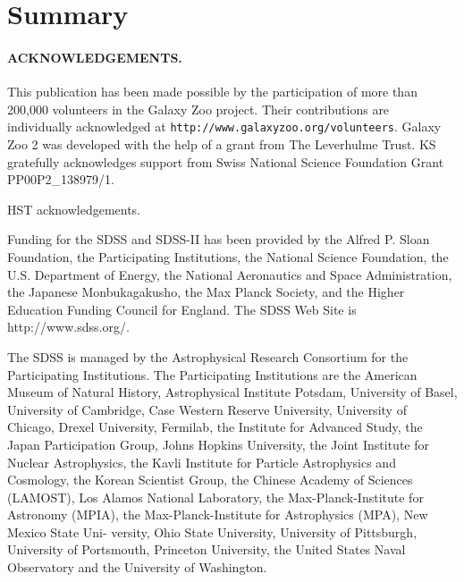 \documentclass[usenatbib]{mn2e}
\begin{document}
\section{Summary}

 
\paragraph*{ACKNOWLEDGEMENTS.} 

This publication has been made possible by the participation of more than 200,000 volunteers in the Galaxy Zoo project. Their contributions are individually acknowledged at \texttt{http://www.galaxyzoo.org/volunteers}. Galaxy Zoo 2 was developed with the help of a grant from The Leverhulme Trust. KS gratefully acknowledges support from Swiss National Science Foundation Grant PP00P2\_138979/1.

HST acknowledgements.

Funding for the SDSS and SDSS-II has been provided by the Alfred P. Sloan Foundation, the Participating Institutions, the National Science Foundation, the U.S. Department of Energy, the National Aeronautics and Space Administration, the Japanese Monbukagakusho, the Max Planck Society, and the Higher Education Funding Council for England. The SDSS Web Site is http://www.sdss.org/. 

The SDSS is managed by the Astrophysical Research Consortium for the Participating Institutions. The Participating Institutions are the American Museum of Natural History, Astrophysical  Institute Potsdam, University of Basel, University of Cambridge, 
Case Western Reserve University, University of Chicago, Drexel University, Fermilab, the Institute for Advanced Study, the Japan 
Participation Group, Johns Hopkins University, the Joint Institute for Nuclear Astrophysics, the Kavli Institute for Particle Astrophysics and Cosmology, the Korean Scientist Group, the Chinese Academy of Sciences (LAMOST), Los Alamos National Laboratory, the Max-Planck-Institute for Astronomy (MPIA), the Max-Planck-Institute for Astrophysics (MPA), New Mexico State Uni- 
versity, Ohio State University, University of Pittsburgh, University of Portsmouth, Princeton University, the United States Naval Observatory and the University of Washington. 


\begin{thebibliography}{}

\end{thebibliography}
\end{document}

